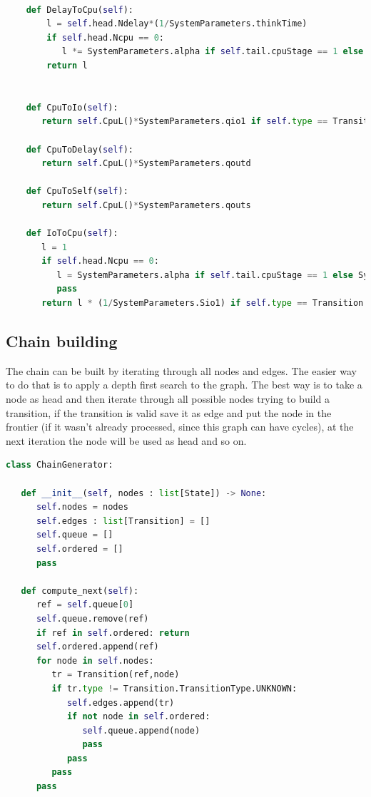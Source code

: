 \documentclass[12pt,a4paper]{article}
\begin{document}
    \begin{lstlisting}[language=python]

    def DelayToCpu(self):
        l = self.head.Ndelay*(1/SystemParameters.thinkTime)
        if self.head.Ncpu == 0:
           l *= SystemParameters.alpha if self.tail.cpuStage == 1 else  SystemParameters.beta
        return l
        

    def CpuToIo(self):      
       return self.CpuL()*SystemParameters.qio1 if self.type == Transition.TransitionType.CPU_TO_IO1 else self.CpuL()*SystemParameters.qio2
        
    def CpuToDelay(self):
       return self.CpuL()*SystemParameters.qoutd
        
    def CpuToSelf(self):
       return self.CpuL()*SystemParameters.qouts
        
    def IoToCpu(self):
       l = 1
       if self.head.Ncpu == 0:
          l = SystemParameters.alpha if self.tail.cpuStage == 1 else SystemParameters.beta
          pass
       return l * (1/SystemParameters.Sio1) if self.type == Transition.TransitionType.IO1_TO_CPU else l* (1/SystemParameters.Sio2)
        \end{lstlisting}


\subsection{Chain building}
The chain can be built by iterating through all nodes and edges. The easier way to do that is to apply a depth first search to the graph. The best way is to take a node as head and then iterate through all possible nodes trying to build a transition, if the transition is valid save it as edge and put the node in the frontier (if it wasn't already processed, since this graph can have cycles), at the next iteration the node will be used as head and so on. 
\begin{lstlisting}[language=python]
class ChainGenerator:
   
   def __init__(self, nodes : list[State]) -> None:
      self.nodes = nodes
      self.edges : list[Transition] = []
      self.queue = []
      self.ordered = []   
      pass

   def compute_next(self):
      ref = self.queue[0]
      self.queue.remove(ref)
      if ref in self.ordered: return
      self.ordered.append(ref)
      for node in self.nodes:
         tr = Transition(ref,node)
         if tr.type != Transition.TransitionType.UNKNOWN:
            self.edges.append(tr)
            if not node in self.ordered:
               self.queue.append(node)
               pass
            pass
         pass
      pass
\end{lstlisting}
\end{document}
